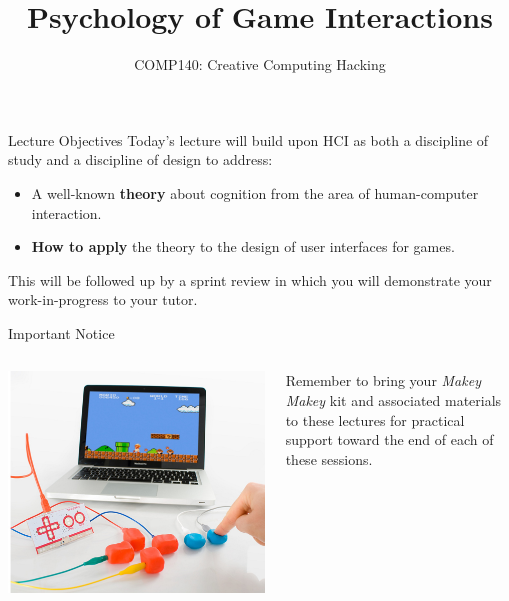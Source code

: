 \documentclass[xcolor={dvipsnames}]{beamer}\usepackage{etoolbox}\newtoggle{printable}\togglefalse{printable}
\begin{document}
\title{Psychology of Game Interactions}   
\subtitle{COMP140: Creative Computing Hacking}

\frame{\titlepage} 

\begin{frame}{Lecture Objectives}
	Today's lecture will build upon HCI as both a discipline of study and a discipline of design to address:
	
	\begin{itemize}
		\item A well-known \textbf{theory} about cognition from the area of human-computer interaction.
		\item \textbf{How to apply} the theory to the design of user interfaces for games.
	\end{itemize}
	
	This will be followed up by a sprint review in which you will demonstrate your work-in-progress to your tutor.
\end{frame}

\begin{frame}{Important Notice}
	\begin{columns}[onlytextwidth]
		\begin{column}{0.45\textwidth}
			\includegraphics[height=22ex]{MakeyMakey.jpg}
		\end{column}
		\begin{column}{0.45\textwidth}
			Remember to bring your \textit{Makey Makey} kit and associated materials to these lectures for practical 
			support toward the end of each of these sessions.
		\end{column}
	\end{columns}
\end{frame}







%
\end{document}
